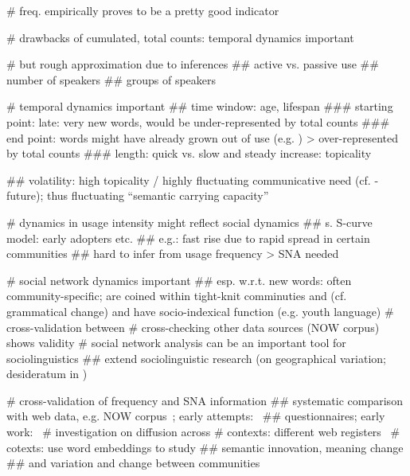 \documentclass[
  a4paper,
  abstract=on,
  captions=tableabove
  ]{scrartcl}
\begin{document}
    \begin{qitem}
      # freq. empirically proves to be a pretty good indicator

      # drawbacks of cumulated, total counts: temporal dynamics important

      # but rough approximation due to inferences
        ## active vs. passive use
        ## number of speakers
        ## groups of speakers

      # temporal dynamics important
        ## time window: age, lifespan
          ### starting point: late: very new words, would be under-represented by total counts
          ### end point: words might have already grown out of use (e.g. ) > over-represented by total counts
          ### length: quick vs. slow and steady increase: topicality

        ## volatility: high topicality / highly fluctuating communicative need (cf. -future); thus fluctuating ``semantic carrying capacity''~\parencite{Grieve2018MappingLexical}

      # dynamics in usage intensity might reflect social dynamics
        ## s. S-curve model: early adopters etc.
        ## e.g.: fast rise due to rapid spread in certain communities
        ## hard to infer from usage frequency > SNA needed

      # social network dynamics important
        ## esp. w.r.t. new words: often community-specific; are coined within tight-knit comminuties and (cf. grammatical change) and have socio-indexical function (e.g. youth language)
      # cross-validation between
      # cross-checking other data sources (NOW corpus) shows validity
      # social network analysis can be an important tool for sociolinguistics
        ## extend sociolinguistic research (on geographical variation; desideratum in \cite{Grieve2019MappingLexical})
    \end{qitem}


    \begin{qitem}
      # cross-validation of frequency and SNA information
        ## systematic comparison with web data, e.g. NOW corpus~\parencite{Davies2013CorpusNews}; early attempts:~\cite{Wurschinger2016UsingWeb}
        ## questionnaires; early work:~\cite{Kerremans2015WebNew}
      # investigation on diffusion across
        # contexts: different web registers~\parencite{Biber2016RegisterVariation}
        # cotexts: use word embeddings to study
          ## semantic innovation, meaning change
          ## and variation and change between communities~\parencite{Tredici2019YouShall} 
    \end{qitem}
\end{document}
